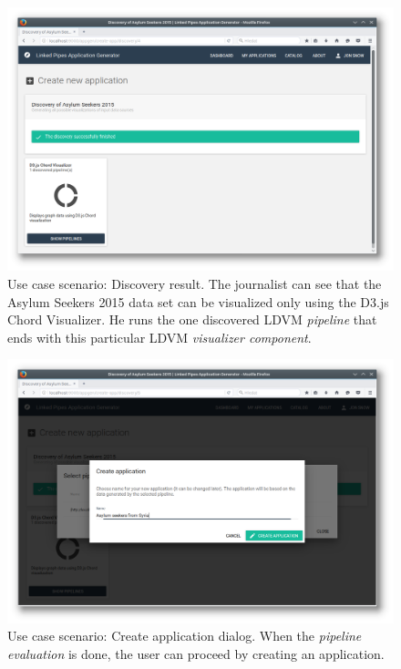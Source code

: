 \begin{figure}
	\centering
	\includegraphics[width=145mm]{img/05_scenario_02_discovery_result.png}
	\caption{Use case scenario: Discovery result. The journalist can see that the Asylum Seekers 2015 data set can be visualized only using the D3.js Chord Visualizer. He runs the one discovered LDVM \emph{pipeline} that ends with this particular LDVM \emph{visualizer component}.}
	\label{fig:scenario-02-discovery-result}
\end{figure}

\begin{figure}
	\centering
	\includegraphics[width=145mm]{img/05_scenario_03_create_application.png}
	\caption{Use case scenario: Create application dialog. When the \emph{pipeline evaluation} is done, the user can proceed by creating an application.}
	\label{fig:scenario-03-create-application}
\end{figure}

